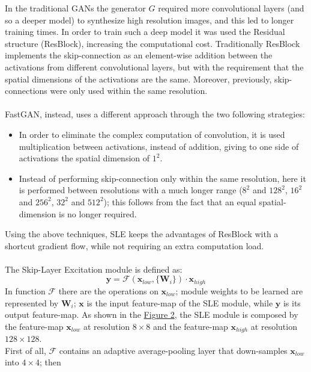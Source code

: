 \documentclass[12pt]{article}
\begin{document}
In the traditional GANs the generator $G$ required more convolutional layers (and so a deeper model) to synthesize 
high resolution images, and this led to longer training times. 
In order to train such a deep model it was used the Residual structure (ResBlock), increasing the computational cost.
Traditionally ResBlock implements the skip-connection as an element-wise addition between the activations from different
convolutional layers, but with the requirement that the spatial dimensions of the activations are the same.
Moreover, previously, skip-connections were only used within the same resolution.\\\\
FastGAN, instead, uses a different approach through the two following strategies:
\begin{itemize}
	\setlength\itemsep{0.01em}
	\item {	
	In order to eliminate the complex computation of convolution, it is used multiplication between activations, instead of 
	addition, giving to one side of activations the spatial dimension of $1^2$.
	}
	\item {
	Instead of performing skip-connection only within the same resolution, here it is performed between resolutions with a much
	longer range ($8^2$ and $128^2$, $16^2$ and $256^2$, $32^2$ and $512^2$); this follows from the fact that an equal spatial-dimension
	is no longer required.
	}
\end{itemize} 
Using the above techniques, SLE keeps the advantages of ResBlock with a shortcut gradient flow, while not requiring an extra computation
load.\\\\
The Skip-Layer Excitation module is defined as:
\begin{equation}
	\mathbf{y} = \mathcal{F}(\mathbf{x}_{low}, \{\mathbf{W}_i\})\cdot \mathbf{x}_{high}
\end{equation}
In function $\mathcal{F}$ there are the operations on $\mathbf{x}_{low}$; module weights to be learned 
are represented by $\mathbf{W}_i$; $\mathbf{x}$ is the input feature-map of the SLE module, while $\mathbf{y}$
is its output feature-map. As shown in the \hyperref[fig:fig2]{Figure 2}, the SLE module is composed by the 
feature-map $\mathbf{x}_{low}$ at resolution $8 \times 8$ and the feature-map $\mathbf{x}_{high}$ at resolution $128 \times 128$.\\
First of all, $\mathcal{F}$ contains an adaptive average-pooling layer that down-samples $\mathbf{x}_{low}$ into $4 \times 4$; then
\end{document}
